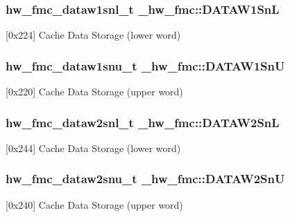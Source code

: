 \subsubsection[{\texorpdfstring{D\+A\+T\+A\+W1\+SnL}{DATAW1SnL}}]{ {\bf hw\+\_\+fmc\+\_\+dataw1snl\+\_\+t} \+\_\+hw\+\_\+fmc\+::\+D\+A\+T\+A\+W1\+SnL}\hypertarget{struct__hw__fmc_a292d273a8323496675947137548bf167}{}\label{struct__hw__fmc_a292d273a8323496675947137548bf167}
\mbox{[}0x224\mbox{]} Cache Data Storage (lower word) 
\subsubsection[{\texorpdfstring{D\+A\+T\+A\+W1\+SnU}{DATAW1SnU}}]{ {\bf hw\+\_\+fmc\+\_\+dataw1snu\+\_\+t} \+\_\+hw\+\_\+fmc\+::\+D\+A\+T\+A\+W1\+SnU}\hypertarget{struct__hw__fmc_a3fc5b1988bbb24b74fb64a25ea7e236b}{}\label{struct__hw__fmc_a3fc5b1988bbb24b74fb64a25ea7e236b}
\mbox{[}0x220\mbox{]} Cache Data Storage (upper word) 
\subsubsection[{\texorpdfstring{D\+A\+T\+A\+W2\+SnL}{DATAW2SnL}}]{ {\bf hw\+\_\+fmc\+\_\+dataw2snl\+\_\+t} \+\_\+hw\+\_\+fmc\+::\+D\+A\+T\+A\+W2\+SnL}\hypertarget{struct__hw__fmc_a8d97db80d1e515f1991c885df58e113e}{}\label{struct__hw__fmc_a8d97db80d1e515f1991c885df58e113e}
\mbox{[}0x244\mbox{]} Cache Data Storage (lower word) 
\subsubsection[{\texorpdfstring{D\+A\+T\+A\+W2\+SnU}{DATAW2SnU}}]{ {\bf hw\+\_\+fmc\+\_\+dataw2snu\+\_\+t} \+\_\+hw\+\_\+fmc\+::\+D\+A\+T\+A\+W2\+SnU}\hypertarget{struct__hw__fmc_a9728f78e9399ff9a76f8d02797a9d080}{}\label{struct__hw__fmc_a9728f78e9399ff9a76f8d02797a9d080}
\mbox{[}0x240\mbox{]} Cache Data Storage (upper word) 
